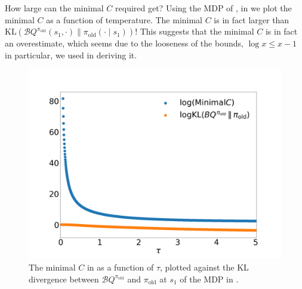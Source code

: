 \documentclass[twoside,11pt]{article}
\newcommand{\KL}{\mathrm{KL}}
\newcommand{\boltzmannQ}{\mathcal{B}Q}
\newcommand{\piold}{{\pi_\mathrm{old}}}
\begin{document}
How large can the minimal $C$ required get? Using the MDP of , in  we plot the minimal $C$ as a function of temperature. The minimal $C$ is in fact larger than $\KL(\boltzmannQ^\piold(s_1, \cdot) \parallel \piold(\cdot \mid s_1))$! This suggests that the minimal $C$ is in fact an overestimate, which seems due to the looseness of the bounds, $\log x \leq x - 1$ in particular, we used in deriving it. 
\begin{figure}[!htb]
    \centering
    \includegraphics[width=\linewidth]{figs/theory/prop3.png}
    \caption{The minimal $C$ in  as a function of $\tau$, plotted against the KL divergence between $\boltzmannQ^\piold$ and $\piold$ at $s_1$ of the MDP in .}
    \label{fig:prop3-c}
\end{figure}
\end{document}
